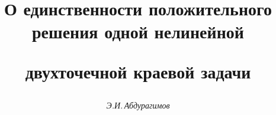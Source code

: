 




%





\newcommand{\const}{\operatorname{const}}


\newcommand{\tts}[1]{}







\setcounter{page}{3}















\author{\it Э.И.\,Абдурагимов}




\title{О единственности положительного решения одной нелинейной


двухточечной краевой задачи}





\date{}




\pagestyle{plain} %







\maketitle


\label{begin}






